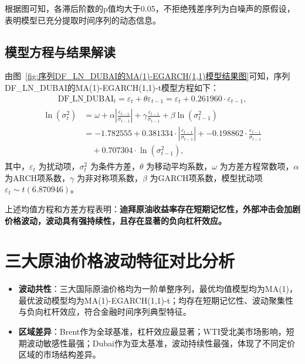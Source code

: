 \documentclass[12pt,a4paper]{ctexart}
\begin{document}
根据图可知，各滞后阶数的p值均大于0.05，不拒绝残差序列为白噪声的原假设，表明模型已充分提取时间序列的动态信息。

\subsection{模型方程与结果解读}

由图~\ref{fig:序列DF_LN_DUBAI的MA(1)-EGARCH(1,1)模型结果图}可知，序列DF\_LN\_DUBAI的MA(1)-EGARCH(1,1)-t模型方程如下：
\begin{align}\label{eq:序列DF_LN_DUBAI的MA(1)-EGARCH(1,1)-t模型均值方程}
\mathrm{DF}\_\mathrm{LN}\_\mathrm{DUBAI}_t=\varepsilon _t+\theta \varepsilon _{t-1}=\varepsilon _t+0.261960\cdot \varepsilon _{t-1},
\end{align}
\begin{gather}\label{eq:序列DF_LN_DUBAI的MA(1)-EGARCH(1,1)-t模型方差方程}
\begin{aligned}
\ln \left( \sigma _{t}^{2} \right) &=\omega +\alpha \left| \frac{\varepsilon _{t-1}}{\sigma _{t-1}} \right|+\gamma \frac{\varepsilon _{t-1}}{\sigma _{t-1}}+\beta \ln \left( \sigma _{t-1}^{2} \right) 
\\
&=-1.782555+ 0.381334\cdot \left| \frac{\varepsilon _{t-1}}{\sigma _{t-1}} \right|+-0.198862\cdot \frac{\varepsilon _{t-1}}{\sigma _{t-1}}
\\
&\quad + 0.707304\cdot \ln \left( \sigma _{t-1}^{2} \right) ,
\end{aligned}
\end{gather}
其中，$\varepsilon_t$ 为扰动项，$\sigma_t^2$ 为条件方差，$\theta$ 为移动平均系数，$\omega$ 为方差方程常数项，$\alpha$ 为ARCH项系数，$\gamma$ 为非对称项系数，$\beta$ 为GARCH项系数，模型扰动项$\varepsilon_t\sim t(6.870946)$。

上述均值方程和方差方程表明：\textbf{迪拜原油收益率存在短期记忆性，外部冲击会加剧价格波动，波动具有强持续性，且存在显著的负向杠杆效应。}



\section{三大原油价格波动特征对比分析}

\begin{itemize}
\item \textbf{波动共性}：三大国际原油价格均为一阶单整序列，最优均值模型均为MA(1)，最优波动模型均为MA(1)-EGARCH(1,1)-t；均存在短期记忆性、波动聚集性与负向杠杆效应，符合金融时间序列典型特征。
\item \textbf{区域差异}：Brent作为全球基准，杠杆效应最显著；WTI受北美市场影响，短期波动敏感性最强；Dubai作为亚太基准，波动持续性最强，体现了不同定价区域的市场结构差异。
\end{itemize}
\end{document}
